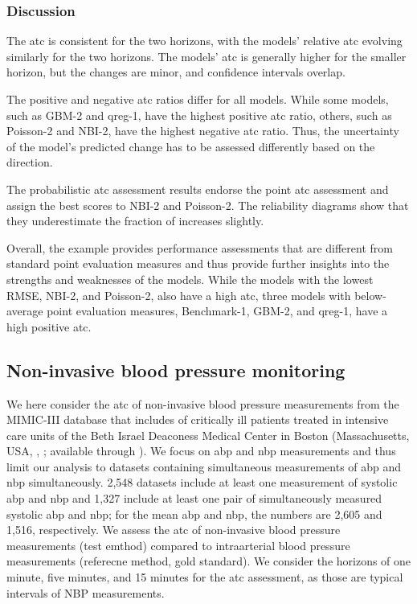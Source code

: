 \documentclass[pdflatex]{sn-jnl}
\theoremstyle{plain}%
\theoremstyle{definition}
\begin{document}
\subsubsection*{Discussion}

The \ac{atc} is consistent for the two horizons, with the models' relative \ac{atc} evolving similarly for the two horizons.
The models' \ac{atc} is generally higher for the smaller horizon, but the changes are minor, and confidence intervals overlap.

The positive and negative \ac{atc} ratios differ for all models.
While some models, such as GBM-2 and qreg-1, have the highest positive \ac{atc} ratio, others, such as Poisson-2 and NBI-2, have the highest negative \ac{atc} ratio.
Thus, the uncertainty of the model's predicted change has to be assessed differently based on the direction.

The probabilistic \ac{atc} assessment results endorse the point \ac{atc} assessment and assign the best scores to NBI-2 and Poisson-2.
The reliability diagrams show that they underestimate the fraction of increases slightly.

Overall, the example provides performance assessments that are different from standard point evaluation measures and thus provide further insights into the strengths and weaknesses of the models.
While the models with the lowest RMSE, NBI-2, and Poisson-2, also have a high \ac{atc}, three models with below-average point evaluation measures, Benchmark-1, GBM-2, and qreg-1, have a high positive \ac{atc}.


\subsection{Non-invasive blood pressure monitoring} \label{sec:application_measurement}

We here consider the \ac{atc} of non-invasive blood pressure measurements from the MIMIC-III database that includes of critically ill patients treated in intensive care units of the Beth Israel Deaconess Medical Center in Boston (Massachusetts, USA, \cite{Johnson2016}, \citealp{Moody2017}; available through \citealp{Goldberger2000}).
We focus on \acf{abp} and \acf{nbp} measurements and thus limit our analysis to datasets containing simultaneous measurements of \ac{abp} and \ac{nbp} simultaneously. 2,548 datasets include at least one measurement of systolic \ac{abp} and \ac{nbp} and 1,327 include at least one pair of simultaneously measured systolic \ac{abp} and \ac{nbp}; for the mean \ac{abp} and \ac{nbp}, the numbers are 2,605 and 1,516, respectively.
We assess the \ac{atc} of non-invasive blood pressure measurements (test emthod) compared to intraarterial blood pressure measurements (referecne method, gold standard).
We consider the horizons of one minute, five minutes, and 15 minutes for the \ac{atc} assessment, as those are typical intervals of NBP measurements.
\end{document}
